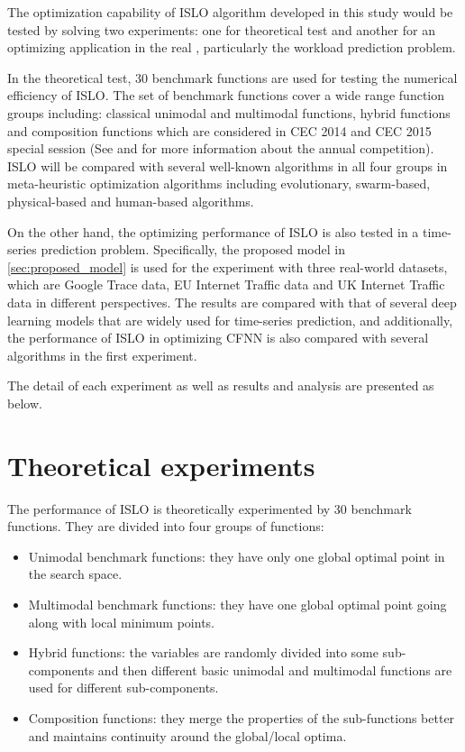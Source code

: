 \documentclass[../main.tex]{subfiles}
\begin{document}
The optimization capability of ISLO algorithm developed in this study would be tested by solving two experiments: one for theoretical test and another for an optimizing application in the real , particularly the workload prediction problem.
 
	In the theoretical test, 30 benchmark functions are used for testing the numerical efficiency of ISLO. The set of benchmark functions cover a wide range function groups including: classical unimodal and multimodal functions, hybrid functions and composition functions which are considered in CEC 2014 and CEC 2015 special session (See \cite{liang2013problem} and \cite{liang2014problem} for more information about the annual competition). ISLO will be compared with several well-known algorithms in all four groups in meta-heuristic optimization algorithms including evolutionary, swarm-based, physical-based and human-based algorithms.
	
	On the other hand, the optimizing performance of ISLO is also tested in a time-series prediction problem. Specifically, the proposed model in \ref{sec:proposed_model} is used for the experiment with three real-world datasets, which are Google Trace data, EU Internet Traffic data and UK Internet Traffic data in different perspectives. The results are compared with that of several deep learning models that are widely used for time-series prediction, and additionally, the performance of ISLO in optimizing CFNN is also compared with several algorithms in the first experiment. 
	
	The detail of each experiment as well as results and analysis are presented as below.
	
\section{Theoretical experiments}
\label{sec:exp_theory}

	The performance of ISLO is theoretically experimented by 30 benchmark functions. They are divided into four groups of functions:
\begin{itemize}
\item Unimodal benchmark functions: they have only one global optimal point in the search space.
\item Multimodal benchmark functions: they have one global optimal point going along with local minimum points.
\item Hybrid functions:  the variables are
randomly divided into some sub-components and then different basic unimodal and multimodal functions are used for different sub-components.
\item Composition functions: they merge the properties of the sub-functions better and maintains continuity around the global/local optima. 
\end{itemize}
\end{document}

